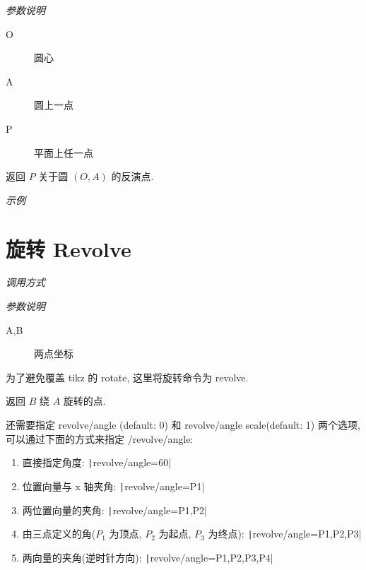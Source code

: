 \emph{参数说明}

\begin{description}
  \item[O] 圆心
  \item[A] 圆上一点
  \item[P] 平面上任一点 
\end{description}

返回 $P$ 关于圆 $(O,A)$ 的反演点.

\emph{示例}


\section{旋转 Revolve}

\emph{调用方式}

\begin{tcolorbox}{}
\end{tcolorbox}

\emph{参数说明}

\begin{description}
  \item[A,B] 两点坐标
\end{description}

\begin{remark*}
  为了避免覆盖 tikz 的 rotate, 这里将旋转命令为 revolve.
\end{remark*}

返回 $B$ 绕 $A$ 旋转的点.

还需要指定 revolve/angle (default: 0) 和 revolve/angle scale(default: 1) 两个选项,可以通过下面的方式来指定 /revolve/angle:

\begin{enumerate}
  \item 直接指定角度: \texttt|revolve/angle=60|
  \item 位置向量与 x 轴夹角: \texttt|revolve/angle={P1}|
  \item 两位置向量的夹角: \texttt|revolve/angle={P1,P2}|
  \item 由三点定义的角($P_1$ 为顶点, $P_2$ 为起点, $P_3$ 为终点): \texttt|revolve/angle={P1,P2,P3}|
  \item 两向量的夹角(逆时针方向): \texttt|revolve/angle={P1,P2,P3,P4}|
\end{enumerate}

